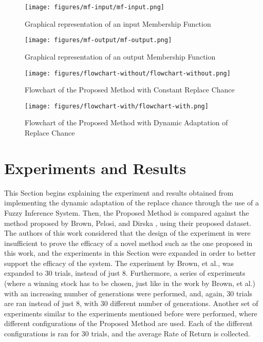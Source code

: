 \documentclass[12pt,journal,draftcls,onecolumn]{IEEEtran}
\begin{document}
\begin{figure}[h!]
\caption{Graphical representation of an input Membership Function}
\label{input-mf}
\begin{center}
\texttt{[image: figures/mf-input/mf-input.png]}
\end{center}
\end{figure}

\begin{figure}[h!]
\caption{Graphical representation of an output Membership Function}
\label{output-mf}
\begin{center}
\texttt{[image: figures/mf-output/mf-output.png]}
\end{center}
\end{figure}

\begin{figure}[h!]
\caption{Flowchart of the Proposed Method with Constant Replace Chance}
\label{flowchart-without-dynamic}
\begin{center}
\texttt{[image: figures/flowchart-without/flowchart-without.png]}
\end{center}
\end{figure}

\begin{figure}[h!]
\caption{Flowchart of the Proposed Method with Dynamic Adaptation of
  Replace Chance}
\label{flowchart-with-dynamic}
\begin{center}
\texttt{[image: figures/flowchart-with/flowchart-with.png]}
\end{center}
\end{figure}

\section{Experiments and Results}
\label{experiments-and-results}

This Section begins explaining the experiment and results obtained from implementing the dynamic adaptation of the replace chance through the use of a Fuzzy Inference System. Then, the Proposed Method is compared against the method proposed by Brown, Pelosi, and Dirska \cite{brown2013dynamic}, using their proposed dataset. The authors of this work considered that the design of the experiment in \cite{brown2013dynamic} were insufficient to prove the efficacy of a novel method such as the one proposed in this work, and the experiments in this Section were expanded in order to better support the efficacy of the system. The experiment by Brown, et al., was expanded to 30 trials, instead of just 8. Furthermore, a series of experiments (where a winning stock has to be chosen, just like in the work by Brown, et al.) with an increasing number of generations were performed, and, again, 30 trials are ran instead of just 8, with 30 different number of generations. Another set of experiments similar to the experiments mentioned before were performed, where different configurations of the Proposed Method are used. Each of the different configurations is ran for 30 trials, and the average Rate of Return is collected.
\end{document}
